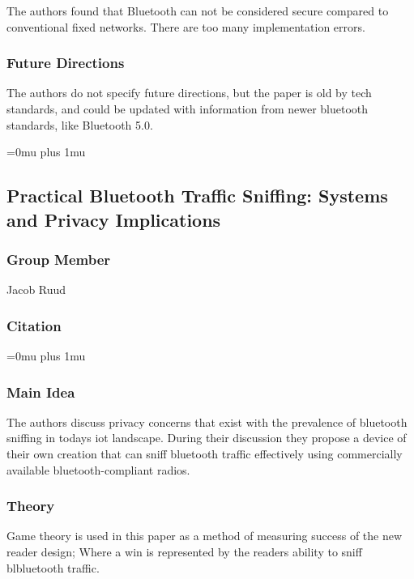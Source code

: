 \noindent
The authors found that Bluetooth can not be considered secure compared to conventional fixed networks.  There are too many implementation errors.

\subsubsection{Future Directions}

\noindent
The authors do not specify future directions, but the paper is old by tech standards, and could be updated with information from newer bluetooth standards, like Bluetooth 5.0.

\Urlmuskip=0mu plus 1mu\relax

\noindent
\subsection{{P}ractical {B}luetooth {T}raffic {S}niffing: {S}ystems and {P}rivacy {I}mplications}

\subsubsection{Group Member}

\noindent
Jacob Ruud

\noindent
\subsubsection{Citation}

\Urlmuskip=0mu plus 1mu\relax

\subsubsection{Main Idea}

\noindent
The authors discuss privacy concerns that exist with the prevalence of bluetooth sniffing in todays iot landscape. During their discussion they propose a device of their own creation that can sniff bluetooth traffic effectively using commercially available bluetooth-compliant radios.

\subsubsection{Theory}

\noindent
Game theory is used in this paper as a method of measuring success of the new reader design; Where a win is represented by the readers ability to sniff blbluetooth traffic.

